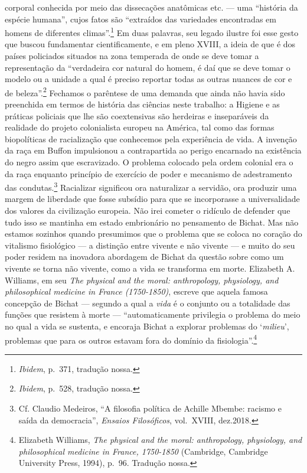 corporal conhecida por meio das dissecações anatômicas etc. --- uma
``história da espécie humana'', cujos fatos são ``extraídos das
variedades encontradas em homens de diferentes climas''.\footnote{\textit{Ibidem},
  p.~371, tradução nossa.} Em duas palavras, seu legado ilustre foi esse
gesto que buscou fundamentar cientificamente, e em pleno XVIII, a ideia
de que é dos países policiados situados na zona temperada de onde se
deve tomar a representação da ``verdadeira cor natural do homem, é daí
que se deve tomar o modelo ou a unidade a qual é preciso reportar todas
as outras nuances de cor e de beleza''.\footnote{\textit{Ibidem}, p.~528,
  tradução nossa.} Fechamos o parêntese de uma demanda que ainda não
havia sido preenchida em termos de história das ciências neste trabalho:
a Higiene e as práticas policiais que lhe são coextensivas são herdeiras
e inseparáveis da realidade do projeto colonialista europeu na América,
tal como das formas biopolíticas de racialização que conhecemos pela
experiência de vida. A invenção da raça em Buffon impulsionou a
contrapartida ao perigo encarnado na existência do negro assim que
escravizado. O problema colocado pela ordem colonial era o da raça
enquanto princípio de exercício de poder e mecanismo de adestramento das
condutas.\footnote{Cf. Claudio Medeiros, ``A filosofia política de
  Achille Mbembe: racismo e saída da democracia'', \textit{Ensaios
  Filosóficos}, vol.~XVIII, dez.2018.} Racializar significou ora
naturalizar a servidão, ora produzir uma margem de liberdade que fosse
subsídio para que se incorporasse a universalidade dos valores da
civilização europeia. Não irei cometer o ridículo de defender que tudo
isso se mantinha em estado embrionário no pensamento de Bichat. Mas não
estamos sozinhos quando presumimos que o problema que se coloca no
coração do vitalismo fisiológico --- a distinção entre vivente e não
vivente --- e muito do seu poder residem na inovadora abordagem de Bichat
da questão sobre como um vivente se torna não vivente, como a vida se
transforma em morte. Elizabeth A. Williams, em seu \textit{The physical
and the moral: anthropology, physiology, and philosophical medicine in
France (1750-1850)}, escreve que aquela famosa concepção de Bichat ---
segundo a qual a \textit{vida} é o conjunto ou a totalidade das funções
que resistem à morte --- ``automaticamente privilegia o problema do meio
no qual a vida se sustenta, e encoraja Bichat a explorar problemas do
`\textit{milieu}', problemas que para os outros estavam fora do domínio da
fisiologia''.\footnote{Elizabeth Williams, \textit{The physical and the
  moral: anthropology, physiology, and philosophical medicine in France,
  1750-1850} (Cambridge, Cambridge University Press, 1994), p.~96.
  Tradução nossa.}

